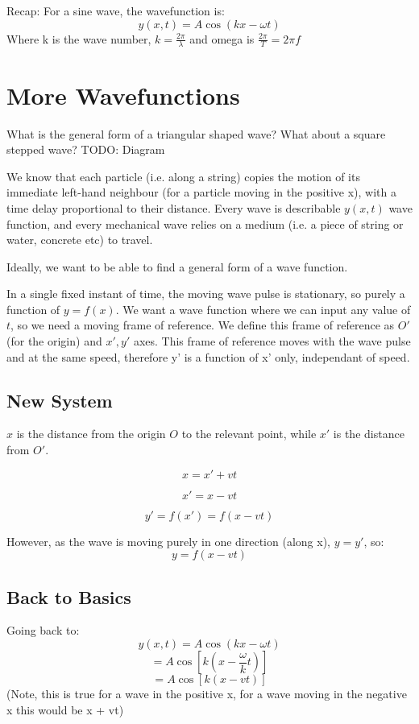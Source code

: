 
Recap: For a sine wave, the wavefunction is:
\[
    y(x,t) = A \cos(kx - \omega t)
\]
Where k is the wave number, $k = \frac{2 \pi}{\lambda}$ and omega is $\frac{2 \pi}{T} = 2 \pi f$

\section*{More Wavefunctions}
What is the general form of a triangular shaped wave? What about a square stepped wave?
TODO: Diagram

We know that each particle (i.e. along a string) copies the motion of its immediate left-hand neighbour (for a particle moving in the positive x), with a time delay proportional to their distance. Every wave is describable $y(x,t)$ wave function, and every mechanical wave relies on a medium (i.e. a piece of string or water, concrete etc) to travel.

Ideally, we want to be able to find a general form of a wave function.

In a single fixed instant of time, the moving wave pulse is stationary, so purely a function of $y = f(x)$. We want a wave function where we can input any value of $t$, so we need a moving frame of reference. We define this frame of reference as $O'$ (for the origin) and $x', y'$ axes. This frame of reference moves with the wave pulse and at the same speed, therefore y' is a function of x' only, independant of speed.

\subsection*{New System}
$x$ is the distance from the origin $O$ to the relevant point, while $x'$ is the distance from $O'$.

\[
    x = x' + vt
\]

\[
    x' = x - vt
\]

\[
    y' = f(x') = f(x-vt)
\]

However, as the wave is moving purely in one direction (along x), $y = y'$, so:
\[
    y = f(x - vt)
\]


\subsection*{Back to Basics}
Going back to:
\[
    y(x,t) = A \cos(kx - \omega t)
\]
\[
    = A \cos\left[k\left(x - \frac{\omega}{k}t\right)\right]
\]
\[
    = A \cos\left[k\left(x - vt\right)\right]
\]
(Note, this is true for a wave in the positive x, for a wave moving in the negative x this would be x + vt)


